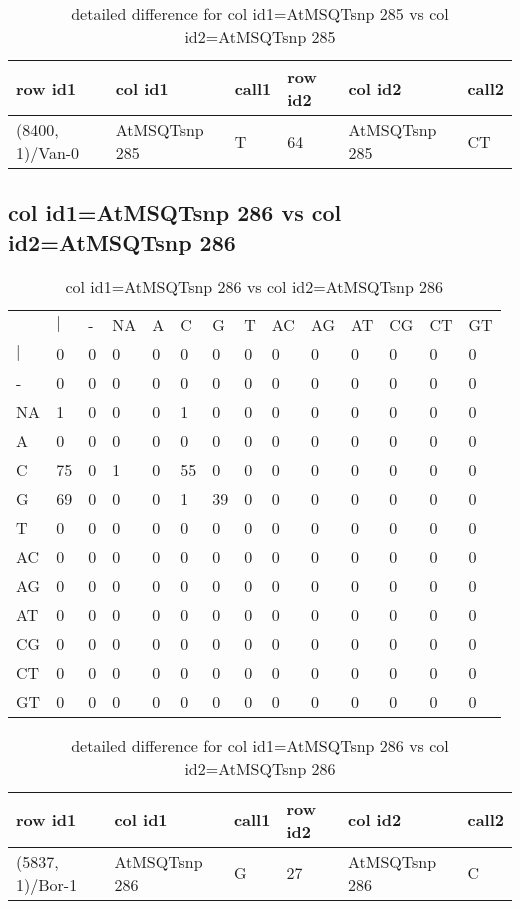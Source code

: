 \begin{center}
\begin{longtable}{|l|l|l|l|l|l|}
\caption{detailed difference for col id1=AtMSQTsnp 285 vs col id2=AtMSQTsnp 285} \label{table_dm625}\\
\hline
row id1&col id1&call1&row id2&col id2&call2\\
\hline
(8400, 1)/Van-0&AtMSQTsnp 285&T&64&AtMSQTsnp 285&CT\\
\hline
\end{longtable}
\end{center}

\subsection{col id1=AtMSQTsnp 286 vs col id2=AtMSQTsnp 286}
\begin{center}
\begin{longtable}{|l|l|l|l|l|l|l|l|l|l|l|l|l|l|}
\caption{col id1=AtMSQTsnp 286 vs col id2=AtMSQTsnp 286} \label{table_dm626}\\
\hline
\\
\hline
&$|$&-&NA&A&C&G&T&AC&AG&AT&CG&CT&GT\\
$|$&0&0&0&0&0&0&0&0&0&0&0&0&0\\
-&0&0&0&0&0&0&0&0&0&0&0&0&0\\
NA&1&0&0&0&1&0&0&0&0&0&0&0&0\\
A&0&0&0&0&0&0&0&0&0&0&0&0&0\\
C&75&0&1&0&55&0&0&0&0&0&0&0&0\\
G&69&0&0&0&1&39&0&0&0&0&0&0&0\\
T&0&0&0&0&0&0&0&0&0&0&0&0&0\\
AC&0&0&0&0&0&0&0&0&0&0&0&0&0\\
AG&0&0&0&0&0&0&0&0&0&0&0&0&0\\
AT&0&0&0&0&0&0&0&0&0&0&0&0&0\\
CG&0&0&0&0&0&0&0&0&0&0&0&0&0\\
CT&0&0&0&0&0&0&0&0&0&0&0&0&0\\
GT&0&0&0&0&0&0&0&0&0&0&0&0&0\\
\hline
\end{longtable}
\end{center}

\begin{center}
\begin{longtable}{|l|l|l|l|l|l|}
\caption{detailed difference for col id1=AtMSQTsnp 286 vs col id2=AtMSQTsnp 286} \label{table_dm627}\\
\hline
row id1&col id1&call1&row id2&col id2&call2\\
\hline
(5837, 1)/Bor-1&AtMSQTsnp 286&G&27&AtMSQTsnp 286&C\\
\hline
\end{longtable}
\end{center}


